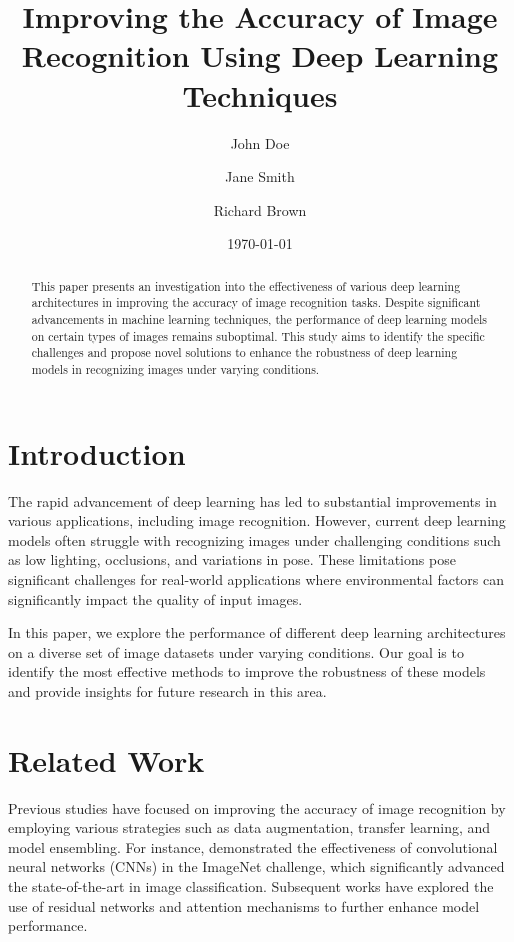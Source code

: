 \documentclass[12pt]{article}
\begin{document}
\title{Improving the Accuracy of Image Recognition Using Deep Learning Techniques}
\author{John Doe \and Jane Smith \and Richard Brown}
\date{\today}

\maketitle

\begin{abstract}
This paper presents an investigation into the effectiveness of various deep learning architectures in improving the accuracy of image recognition tasks. Despite significant advancements in machine learning techniques, the performance of deep learning models on certain types of images remains suboptimal. This study aims to identify the specific challenges and propose novel solutions to enhance the robustness of deep learning models in recognizing images under varying conditions.
\end{abstract}

\section{Introduction}
The rapid advancement of deep learning has led to substantial improvements in various applications, including image recognition. However, current deep learning models often struggle with recognizing images under challenging conditions such as low lighting, occlusions, and variations in pose. These limitations pose significant challenges for real-world applications where environmental factors can significantly impact the quality of input images.

In this paper, we explore the performance of different deep learning architectures on a diverse set of image datasets under varying conditions. Our goal is to identify the most effective methods to improve the robustness of these models and provide insights for future research in this area.

\section{Related Work}
Previous studies have focused on improving the accuracy of image recognition by employing various strategies such as data augmentation, transfer learning, and model ensembling. For instance, \citet{krizhevsky2012imagenet} demonstrated the effectiveness of convolutional neural networks (CNNs) in the ImageNet challenge, which significantly advanced the state-of-the-art in image classification. Subsequent works have explored the use of residual networks \citep{he2016deep} and attention mechanisms \citep{wang2017non} to further enhance model performance.
\end{document}
